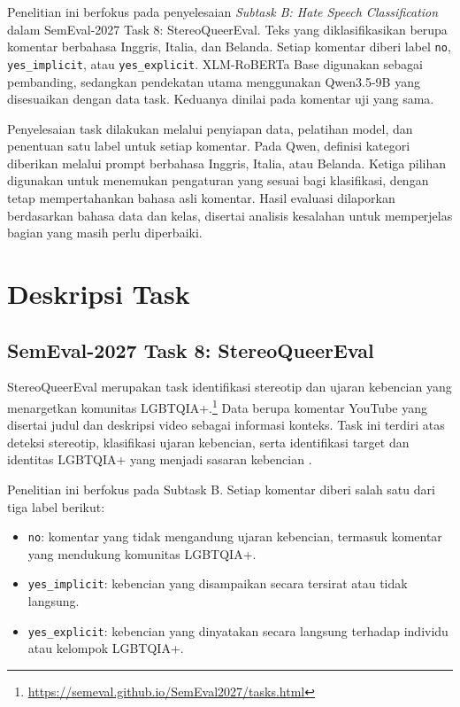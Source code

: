 \documentclass[11pt]{article}
\begin{document}
Penelitian ini berfokus pada penyelesaian \textit{Subtask B: Hate Speech Classification} dalam SemEval-2027 Task 8: StereoQueerEval. Teks yang diklasifikasikan berupa komentar berbahasa Inggris, Italia, dan Belanda. Setiap komentar diberi label \texttt{no}, \texttt{yes\_implicit}, atau \texttt{yes\_explicit}. XLM-RoBERTa Base digunakan sebagai pembanding, sedangkan pendekatan utama menggunakan Qwen3.5-9B yang disesuaikan dengan data task. Keduanya dinilai pada komentar uji yang sama.

Penyelesaian task dilakukan melalui penyiapan data, pelatihan model, dan penentuan satu label untuk setiap komentar. Pada Qwen, definisi kategori diberikan melalui prompt berbahasa Inggris, Italia, atau Belanda. Ketiga pilihan digunakan untuk menemukan pengaturan yang sesuai bagi klasifikasi, dengan tetap mempertahankan bahasa asli komentar. Hasil evaluasi dilaporkan berdasarkan bahasa data dan kelas, disertai analisis kesalahan untuk memperjelas bagian yang masih perlu diperbaiki.

\section{Deskripsi Task}
\subsection{SemEval-2027 Task 8: StereoQueerEval}
\label{sec:task}
StereoQueerEval merupakan task identifikasi stereotip dan ujaran kebencian yang menargetkan komunitas LGBTQIA+.\footnote{\url{https://semeval.github.io/SemEval2027/tasks.html}} Data berupa komentar YouTube yang disertai judul dan deskripsi video sebagai informasi konteks. Task ini terdiri atas deteksi stereotip, klasifikasi ujaran kebencian, serta identifikasi target dan identitas LGBTQIA+ yang menjadi sasaran kebencian \citep{stereoqueereval-2026-data}.

Penelitian ini berfokus pada Subtask B. Setiap komentar diberi salah satu dari tiga label berikut:
\begin{itemize}
    \item \texttt{no}: komentar yang tidak mengandung ujaran kebencian, termasuk komentar yang mendukung komunitas LGBTQIA+.
    \item \texttt{yes\_implicit}: kebencian yang disampaikan secara tersirat atau tidak langsung.
    \item \texttt{yes\_explicit}: kebencian yang dinyatakan secara langsung terhadap individu atau kelompok LGBTQIA+.
\end{itemize}
\end{document}
